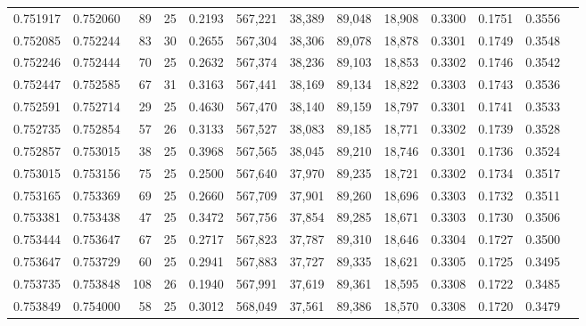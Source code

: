 \begin{tabular}{rrrrrrrrrrrrr}
0.751917 & 0.752060 &    89 &  25 &                                     0.2193 & 567,221 &  38,389 &  89,048 &  18,908 & 0.3300 & 0.1751 & 0.3556 \\
0.752085 & 0.752244 &    83 &  30 &                                     0.2655 & 567,304 &  38,306 &  89,078 &  18,878 & 0.3301 & 0.1749 & 0.3548 \\
0.752246 & 0.752444 &    70 &  25 &                                     0.2632 & 567,374 &  38,236 &  89,103 &  18,853 & 0.3302 & 0.1746 & 0.3542 \\
0.752447 & 0.752585 &    67 &  31 &                                     0.3163 & 567,441 &  38,169 &  89,134 &  18,822 & 0.3303 & 0.1743 & 0.3536 \\
0.752591 & 0.752714 &    29 &  25 &                                     0.4630 & 567,470 &  38,140 &  89,159 &  18,797 & 0.3301 & 0.1741 & 0.3533 \\
0.752735 & 0.752854 &    57 &  26 &                                     0.3133 & 567,527 &  38,083 &  89,185 &  18,771 & 0.3302 & 0.1739 & 0.3528 \\
0.752857 & 0.753015 &    38 &  25 &                                     0.3968 & 567,565 &  38,045 &  89,210 &  18,746 & 0.3301 & 0.1736 & 0.3524 \\
0.753015 & 0.753156 &    75 &  25 &                                     0.2500 & 567,640 &  37,970 &  89,235 &  18,721 & 0.3302 & 0.1734 & 0.3517 \\
0.753165 & 0.753369 &    69 &  25 &                                     0.2660 & 567,709 &  37,901 &  89,260 &  18,696 & 0.3303 & 0.1732 & 0.3511 \\
0.753381 & 0.753438 &    47 &  25 &                                     0.3472 & 567,756 &  37,854 &  89,285 &  18,671 & 0.3303 & 0.1730 & 0.3506 \\
0.753444 & 0.753647 &    67 &  25 &                                     0.2717 & 567,823 &  37,787 &  89,310 &  18,646 & 0.3304 & 0.1727 & 0.3500 \\
0.753647 & 0.753729 &    60 &  25 &                                     0.2941 & 567,883 &  37,727 &  89,335 &  18,621 & 0.3305 & 0.1725 & 0.3495 \\
0.753735 & 0.753848 &   108 &  26 &                                     0.1940 & 567,991 &  37,619 &  89,361 &  18,595 & 0.3308 & 0.1722 & 0.3485 \\
0.753849 & 0.754000 &    58 &  25 &                                     0.3012 & 568,049 &  37,561 &  89,386 &  18,570 & 0.3308 & 0.1720 & 0.3479 \\

\end{tabular}

